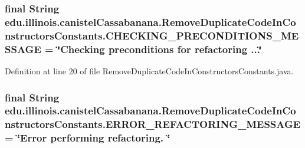 \hypertarget{classedu_1_1illinois_1_1canistelCassabanana_1_1RemoveDuplicateCodeInConstructorsConstants_af08e2ca4fcb3b7e1dd047b88a278d125}{
\subsubsection[{CHECKING\_\-PRECONDITIONS\_\-MESSAGE}]{\setlength{\rightskip}{0pt plus 5cm}final String {\bf edu.illinois.canistelCassabanana.RemoveDuplicateCodeInConstructorsConstants.CHECKING\_\-PRECONDITIONS\_\-MESSAGE} = \char`\"{}Checking preconditions for refactoring ...\char`\"{}}}
\label{classedu_1_1illinois_1_1canistelCassabanana_1_1RemoveDuplicateCodeInConstructorsConstants_af08e2ca4fcb3b7e1dd047b88a278d125}


Definition at line 20 of file RemoveDuplicateCodeInConstructorsConstants.java.

\hypertarget{classedu_1_1illinois_1_1canistelCassabanana_1_1RemoveDuplicateCodeInConstructorsConstants_a2c16519d26ea44a059eb7c581ffba184}{
\subsubsection[{ERROR\_\-REFACTORING\_\-MESSAGE}]{\setlength{\rightskip}{0pt plus 5cm}final String {\bf edu.illinois.canistelCassabanana.RemoveDuplicateCodeInConstructorsConstants.ERROR\_\-REFACTORING\_\-MESSAGE} = \char`\"{}Error performing refactoring. \char`\"{}}}
\label{classedu_1_1illinois_1_1canistelCassabanana_1_1RemoveDuplicateCodeInConstructorsConstants_a2c16519d26ea44a059eb7c581ffba184}


